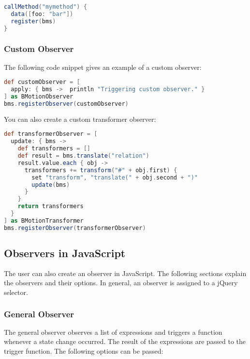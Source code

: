 \begin{lstlisting}[float=ht,language=Groovy]
callMethod("mymethod") {
  data([foo: "bar"])
  register(bms)
}
\end{lstlisting}

\subsubsection{Custom Observer}
\label{sec:custom_observers}

The following code snippet gives an example of a custom observer:
\begin{lstlisting}[float=ht,language=Groovy]
def customObserver = [ 
  apply: { bms ->  println "Triggering custom observer." } 
] as BMotionObserver
bms.registerObserver(customObserver)
\end{lstlisting}

You can also create a custom transformer observer:
\begin{lstlisting}[float=ht,language=Groovy]
def transformerObserver = [
  update: { bms ->
    def transformers = []
    def result = bms.translate("relation")					
    result.value.each { obj ->
      transformers += transform("#" + obj.first) {
        set "transform", "translate(" + obj.second + ")"
        update(bms)
      }
    }
    return transformers
  }
] as BMotionTransformer
bms.registerObserver(transformerObserver)
\end{lstlisting}

\subsection{Observers in JavaScript}
\label{sec:js_observers}

The user can also create an observer in JavaScript.
The following sections explain the observers and their options.
In general, an observer is assigned to a jQuery selector.

\subsubsection{General Observer}

The general observer observes a list of expressions and triggers a function whenever a state change occurred.
The result of the expressions are passed to the trigger function.
The following options can be passed:

